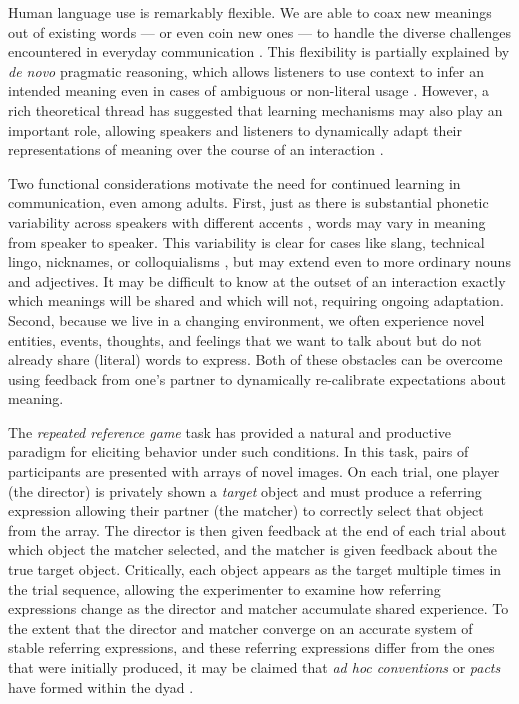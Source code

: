 \documentclass[alpha-refs]{wiley-article}
\begin{document}
Human language use is remarkably flexible.
We are able to coax new meanings out of existing words --- or even coin new ones --- to handle the diverse challenges encountered in everyday communication \citep{Clark83_NonceSense,davidson_nice_1986}.
This flexibility is partially explained by \emph{de novo} pragmatic reasoning, which allows listeners to use context to infer an intended meaning even in cases of ambiguous or non-literal usage \citep{LascaridesCopestake98_PragmaticsWordMeaning,Glucksberg01_FigurativeLanguage,GoodmanFrank16_RSATiCS}.
However, a rich theoretical thread has suggested that learning mechanisms may also play an important role, allowing speakers and listeners to dynamically adapt their representations of meaning over the course of an interaction \citep{BrennanClark96_ConceptualPactsConversation,pickering2004toward,delaney2019neural}.

Two functional considerations motivate the need for continued learning in communication, even among adults.
First, just as there is substantial phonetic variability across speakers with different accents \citep{kleinschmidt2019structure}, words may vary in meaning from speaker to speaker.
This variability is clear for cases like slang, technical lingo, nicknames, or colloquialisms \citep[e.g.][]{Clark98_CommunalLexicons}, but may extend even to more ordinary nouns and adjectives.
It may be difficult to know at the outset of an interaction exactly which meanings will be shared and which will not, requiring ongoing adaptation.
Second, because we live in a changing environment, we often experience novel entities, events, thoughts, and feelings that we want to talk about but do not already share (literal) words to express.
Both of these obstacles can be overcome using feedback from one's partner to dynamically re-calibrate expectations about meaning.

The \emph{repeated reference game} task has provided a natural and productive paradigm for eliciting behavior under such conditions.
In this task, pairs of participants are presented with arrays of novel images.
On each trial, one player (the director) is privately shown a \emph{target} object and must produce a referring expression allowing their partner (the matcher) to correctly select that object from the array.
The director is then given feedback at the end of each trial about which object the matcher selected, and the matcher is given feedback about the true target object.
Critically, each object appears as the target multiple times in the trial sequence, allowing the experimenter to examine how referring expressions change as the director and matcher accumulate shared experience.
To the extent that the director and matcher converge on an accurate system of stable referring expressions, and these referring expressions differ from the ones that were initially produced, it may be claimed that \emph{ad hoc conventions} or \emph{pacts} have formed within the dyad \citep{hawkins2018emergence}.
\end{document}

